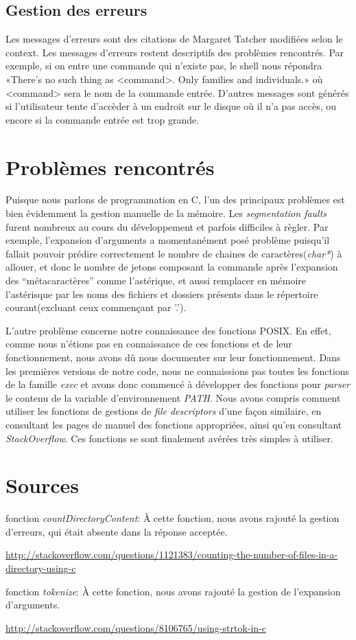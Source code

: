 \documentclass[letterpaper,12pt]{scrartcl}
\begin{document}
		\subsection{Gestion des erreurs}
			Les messages d'erreurs sont des citations de Margaret Tatcher modifiées selon le context. Les messages d'erreurs restent descriptifs des problèmes rencontrés. Par exemple, si on entre une commande qui n'existe pas, le shell nous répondra «There's no such thing as <command>. Only families and individuals.» où <command> sera le nom de la commande entrée. D'autres messages sont générés si l'utilisateur tente d'accèder à un endroit sur le disque où il n'a pas accès, ou encore si la commande entrée est trop grande. 

	        \section{Problèmes rencontrés}
		Puisque nous parlons de programmation en C, l'un des principaux problèmes est bien évidemment la gestion manuelle de la mémoire. Les \textit{segmentation faults} furent nombreux au cours du développement et parfois difficiles à règler. Par exemple, l'expansion d'arguments a momentanément posé problème puisqu'il fallait pouvoir prédire correctement le nombre de chaines de caractères(\textit{char*}) à allouer, et donc le nombre de jetons composant la commande après l'expansion des ``métacaractères'' comme l'astérique, et aussi remplacer en mémoire l'astérisque par les noms des fichiers et dossiers présents dans le répertoire courant(excluant ceux commençant par '.'). 

		L'autre problème concerne notre connaissance des fonctions POSIX. En effet, comme nous n'étions pas en connaissance de ces fonctions et de leur fonctionnement, nous avons dû nous documenter sur leur fonctionnement. Dans les premières versions de notre code, nous ne connaissions pas toutes les fonctions de la famille \textit{exec} et avons donc commencé à développer des fonctions pour \textit{parser} le contenu de la variable d'environnement \textit{PATH}. Nous avons compris comment utiliser les fonctions de gestions de \textit{file descriptors} d'une façon similaire, en consultant les pages de manuel des fonctions appropriées, ainsi qu'en consultant \textit{StackOverflow}. Ces fonctions se sont finalement avérées très simples à utiliser.

        \section{Sources}
        fonction \textit{countDirectoryContent}: 
       À cette fonction, nous avons rajouté la gestion d'erreurs, qui était absente dans la réponse acceptée.


        \url{http://stackoverflow.com/questions/1121383/counting-the-number-of-files-in-a-directory-using-c}
        
        fonction \textit{tokenize}: 
        À cette fonction, nous avons rajouté la gestion de l'expansion d'arguments.


        \url{http://stackoverflow.com/questions/8106765/using-strtok-in-c}
        
\end{document}
